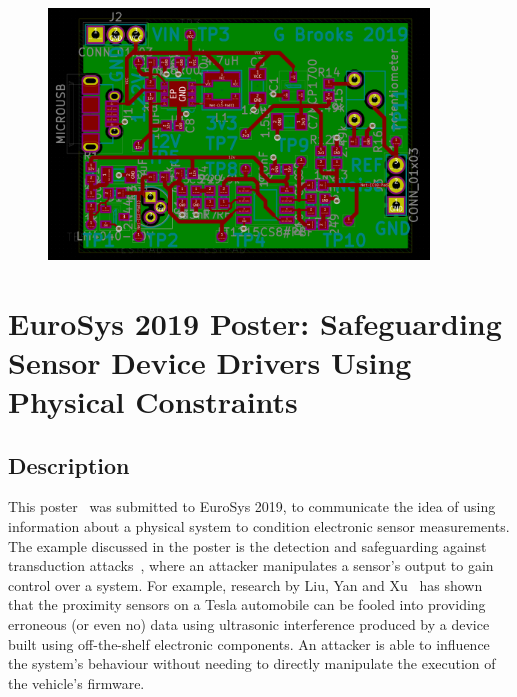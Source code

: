 \documentclass[12pt]{article}
\begin{document}
\begin{appendix}
    \vspace{-1.5cm}
    \begin{figure}[H]
      \centering
      \includegraphics[angle=90, width=0.9\textwidth]{fig/pcb.PNG}
      \label{fig:pcb}
    \end{figure}

    \newpage


  \section{EuroSys 2019 Poster: Safeguarding Sensor Device Drivers Using Physical Constraints}
    \subsection{Description}
      This poster~\cite{eurosys_poster} was submitted to EuroSys 2019, to communicate the idea of using information about a physical system to condition electronic sensor measurements. The example discussed in the poster is the detection and safeguarding against transduction attacks~\cite{Fu_2018}, where an attacker manipulates a sensor's output to gain control over a system. For example, research by Liu, Yan and Xu~\cite{autonomous_vehicles} has shown that the proximity sensors on a Tesla automobile can be fooled into providing erroneous (or even no) data using ultrasonic interference produced by a device built using off-the-shelf electronic components. An attacker is able to influence the system's behaviour without needing to directly manipulate the execution of the vehicle's firmware.\\


\end{appendix}
\end{document}
